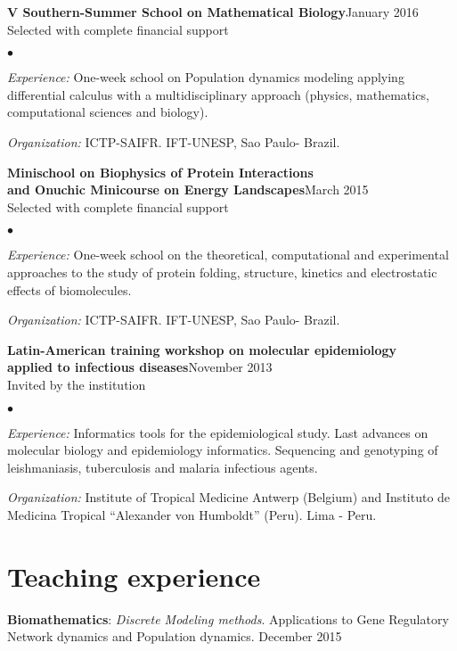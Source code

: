 \documentclass[margin,line]{res}
\newenvironment{list2}{
  \begin{list}{$\bullet$}{%
      \setlength{\itemsep}{0in}
      \setlength{\parsep}{0in} \setlength{\parskip}{0in}
      \setlength{\topsep}{0in} \setlength{\partopsep}{0in}
      \setlength{\leftmargin}{0.2in}}}{\end{list}}
\begin{document}
\begin{resume}
{\bf V Southern-Summer School on Mathematical Biology}\hfill {January 2016}\\
Selected with complete financial support
\begin{list2} %
	\item \textit{Experience:} One-week school on Population dynamics modeling applying differential calculus with a multidisciplinary approach (physics, mathematics, computational sciences and biology).
	\item \textit{Organization:} ICTP-SAIFR. IFT-UNESP, Sao Paulo- Brazil.
\end{list2}

{\bf Minischool on Biophysics of Protein Interactions \\and Onuchic Minicourse on Energy Landscapes}\hfill {March 2015}\\
Selected with complete financial support
\begin{list2} %
	\item \textit{Experience:} One-week school on the theoretical, computational and experimental approaches to the study of protein folding, structure, kinetics and electrostatic effects of biomolecules.
	\item \textit{Organization:} ICTP-SAIFR. IFT-UNESP, Sao Paulo- Brazil.
\end{list2}

{\bf Latin-American training workshop on molecular epidemiology \\applied to infectious diseases}\hfill {November 2013}\\
Invited by the institution
\begin{list2} %
	\item \textit{Experience:} Informatics tools for the epidemiological study. Last advances on molecular biology and epidemiology informatics. Sequencing and genotyping of leishmaniasis, tuberculosis and malaria infectious agents.
	\item \textit{Organization:} Institute of Tropical Medicine Antwerp (Belgium) and Instituto de Medicina Tropical “Alexander von Humboldt” (Peru). Lima - Peru.\\
\end{list2}

\section{\sc Teaching experience}
{\bf Biomathematics}:  {\em Discrete Modeling methods}. Applications to Gene Regulatory Network dynamics and Population dynamics. December 2015\\


\end{resume}
\end{document}
